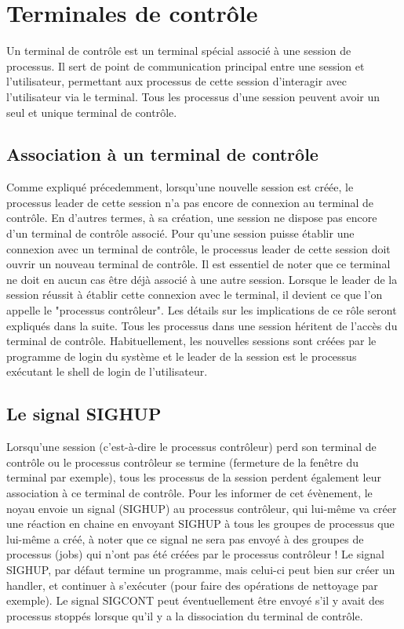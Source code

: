\section{Terminales de contrôle}
Un terminal de contrôle est un terminal spécial associé à une session de processus. Il sert de point de communication principal entre une session et l'utilisateur, permettant aux processus de cette session d'interagir avec l'utilisateur via le terminal. Tous les processus d’une session peuvent avoir un seul et unique terminal de contrôle.

\subsection{Association à un terminal de contrôle}

Comme expliqué précedemment, lorsqu'une nouvelle session est créée, le processus leader de cette session n'a pas encore de connexion au terminal de contrôle. En d'autres termes, à sa création, une session ne dispose pas encore d'un terminal de contrôle associé.
\newline
Pour qu'une session puisse établir une connexion avec un terminal de contrôle, le processus leader de cette session doit ouvrir un nouveau terminal de contrôle. Il est essentiel de noter que ce terminal ne doit en aucun cas être déjà associé à une autre session. 
\newline
Lorsque le leader de la session réussit à établir cette connexion avec le terminal, il devient ce que l'on appelle le "processus contrôleur". Les détails sur les implications de ce rôle seront expliqués dans la suite. 
\newline
Tous les processus dans une session héritent de l’accès du terminal de contrôle. 
Habituellement, les nouvelles sessions sont créées par le programme de login du système et le leader de la session est le processus exécutant le shell de login de l'utilisateur.

\subsection{Le signal SIGHUP}

Lorsqu’une session (c’est-à-dire le processus contrôleur) perd son terminal de contrôle ou le processus contrôleur se termine (fermeture de la fenêtre du terminal par exemple), tous les processus de la session perdent également leur association à ce terminal de contrôle. 
\newline
Pour les informer de cet évènement, le noyau envoie un signal (SIGHUP) au processus contrôleur, qui lui-même va créer une réaction en chaine en envoyant SIGHUP à tous les groupes de processus que lui-même a créé, à noter que ce signal ne sera pas envoyé à des groupes de processus (jobs) qui n’ont pas été créées par le processus contrôleur ! 
\newline
Le signal SIGHUP, par défaut termine un programme, mais celui-ci peut bien sur créer un handler, et continuer à s’exécuter (pour faire des opérations de nettoyage par exemple). Le signal SIGCONT peut éventuellement être envoyé s’il y avait des processus stoppés lorsque qu’il y a la dissociation du terminal de contrôle. 
